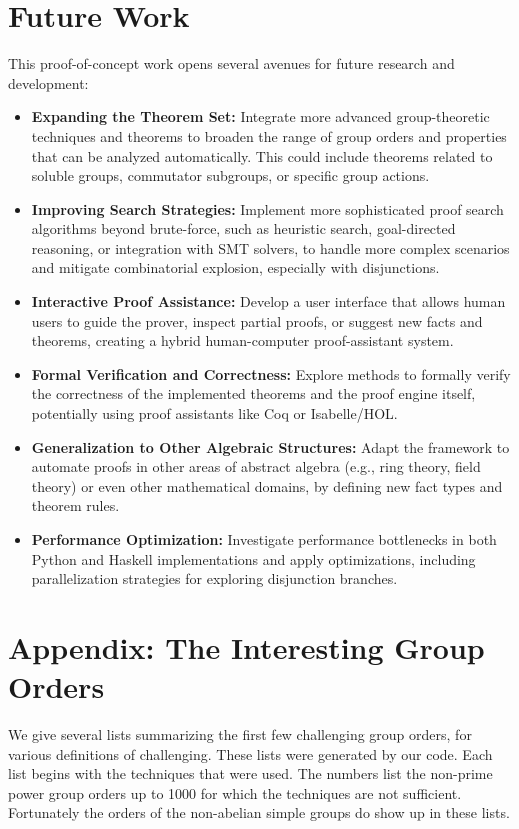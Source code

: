 \documentclass[11pt,
oneside]{article} %
\begin{document}
\section{Future Work}
This proof-of-concept work opens several avenues for future research and development:
\begin{itemize}
    \item \textbf{Expanding the Theorem Set:} Integrate more advanced group-theoretic techniques and theorems to broaden the range of group orders and properties that can be analyzed automatically. This could include theorems related to soluble groups, commutator subgroups, or specific group actions.
    \item \textbf{Improving Search Strategies:} Implement more sophisticated proof search algorithms beyond brute-force, such as heuristic search, goal-directed reasoning, or integration with SMT solvers, to handle more complex scenarios and mitigate combinatorial explosion, especially with disjunctions.
    \item \textbf{Interactive Proof Assistance:} Develop a user interface that allows human users to guide the prover, inspect partial proofs, or suggest new facts and theorems, creating a hybrid human-computer proof-assistant system.
    \item \textbf{Formal Verification and Correctness:} Explore methods to formally verify the correctness of the implemented theorems and the proof engine itself, potentially using proof assistants like Coq or Isabelle/HOL.
    \item \textbf{Generalization to Other Algebraic Structures:} Adapt the framework to automate proofs in other areas of abstract algebra (e.g., ring theory, field theory) or even other mathematical domains, by defining new fact types and theorem rules.
    \item \textbf{Performance Optimization:} Investigate performance bottlenecks in both Python and Haskell implementations and apply optimizations, including parallelization strategies for exploring disjunction branches.
\end{itemize}

\section{Appendix: The Interesting Group Orders}
We give several lists summarizing the first few challenging group
orders, for various definitions of challenging.  These lists were
generated by our code.  Each list begins with the techniques that were
used. The numbers list the non-prime power group orders up to 1000 for
which the techniques are not sufficient. Fortunately the orders of the
non-abelian simple groups do show up in these lists.  \newline
\end{document}
